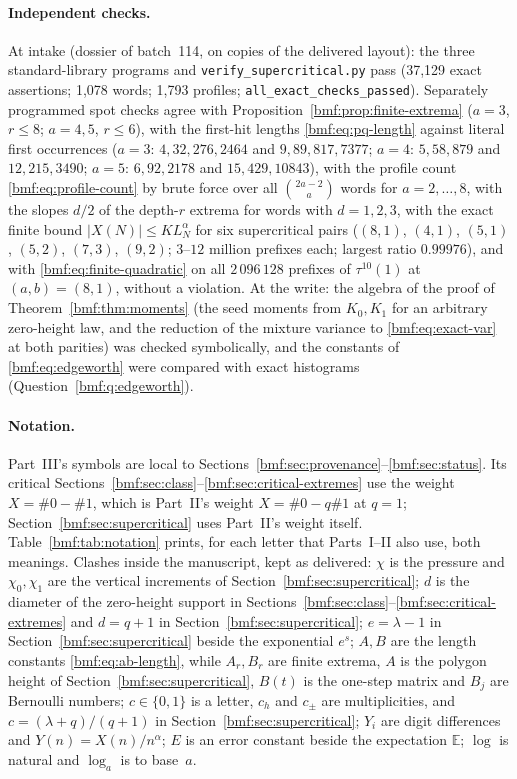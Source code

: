 \documentclass[11pt]{article}
\numberwithin{equation}{section}
\theoremstyle{definition}
\theoremstyle{remark}
\newcommand{\abs}[1]{\lvert#1\rvert}
\newcommand{\E}{\mathbb E}
\begin{document}
\paragraph{Independent checks.}
At intake (dossier of batch~114, on copies of the delivered layout): the
three standard-library programs and \texttt{verify\_supercritical.py} pass
(37,129 exact assertions; 1,078 words; 1,793 profiles;
\texttt{all\_exact\_checks\_passed}). Separately programmed spot checks
agree with Proposition~\ref{bmf:prop:finite-extrema} ($a=3$, $r\le8$;
$a=4,5$, $r\le6$), with the first-hit lengths \eqref{bmf:eq:pq-length}
against literal first occurrences ($a=3$: $4,32,276,2464$ and
$9,89,817,7377$; $a=4$: $5,58,879$ and $12,215,3490$; $a=5$: $6,92,2178$
and $15,429,10843$), with the profile count \eqref{bmf:eq:profile-count}
by brute force over all $\binom{2a-2}{a}$ words for $a=2,\dots,8$, with the
slopes $d/2$ of the depth-$r$ extrema for words with $d=1,2,3$, with the
exact finite bound $\abs{X(N)}\le KL_N^\alpha$ for six supercritical pairs
($(8,1)$, $(4,1)$, $(5,1)$, $(5,2)$, $(7,3)$, $(9,2)$; $3$--$12$ million
prefixes each; largest ratio $0.99976$), and with
\eqref{bmf:eq:finite-quadratic} on all $2\,096\,128$ prefixes of
$\tau^{10}(1)$ at $(a,b)=(8,1)$, without a violation. At the write: the
algebra of the proof of Theorem~\ref{bmf:thm:moments} (the seed moments
from $K_0,K_1$ for an arbitrary zero-height law, and the reduction of the
mixture variance to \eqref{bmf:eq:exact-var} at both parities) was checked
symbolically, and the constants of \eqref{bmf:eq:edgeworth} were compared
with exact histograms (Question~\ref{bmf:q:edgeworth}).

\paragraph{Notation.} Part~III's symbols are local to
Sections~\ref{bmf:sec:provenance}--\ref{bmf:sec:status}. Its critical
Sections~\ref{bmf:sec:class}--\ref{bmf:sec:critical-extremes} use the
weight $X=\#0-\#1$, which is Part~II's weight $X=\#0-q\#1$ at $q=1$;
Section~\ref{bmf:sec:supercritical} uses Part~II's weight itself.
Table~\ref{bmf:tab:notation} prints, for each letter that Parts~I--II also
use, both meanings. Clashes inside the manuscript, kept as delivered: $\chi$
is the pressure and $\chi_0,\chi_1$ are the vertical increments of
Section~\ref{bmf:sec:supercritical}; $d$ is the diameter of the zero-height
support in Sections~\ref{bmf:sec:class}--\ref{bmf:sec:critical-extremes} and $d=q+1$ in Section~\ref{bmf:sec:supercritical}; $e=\lambda-1$
in Section~\ref{bmf:sec:supercritical} beside the exponential $e^s$; $A,B$
are the length constants \eqref{bmf:eq:ab-length}, while $A_r,B_r$ are
finite extrema, $A$ is the polygon height of
Section~\ref{bmf:sec:supercritical}, $B(t)$ is the one-step matrix and $B_j$
are Bernoulli numbers; $c\in\{0,1\}$ is a letter, $c_h$ and $c_\pm$ are
multiplicities, and $c=(\lambda+q)/(q+1)$ in
Section~\ref{bmf:sec:supercritical}; $Y_i$ are digit differences and
$Y(n)=X(n)/n^\alpha$; $E$ is an error constant beside the expectation
$\E$; $\log$ is natural and $\log_a$ is to base~$a$.
\end{document}
